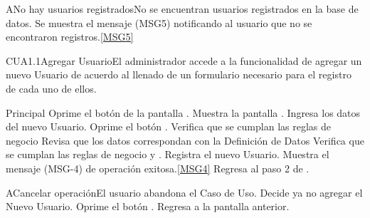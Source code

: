 	\begin{UCtrayectoriaA}{A}{No hay usuarios registrados}{No se encuentran usuarios registrados en la base de datos.}
			\UCpaso Se muestra el mensaje (MSG5) notificando al usuario que no se encontraron registros.\ref{MSG5}
	\end{UCtrayectoriaA}

	
	\begin{UseCase}{CUA1.1}{Agregar Usuario}{El administrador accede a la funcionalidad de agregar un nuevo Usuario de acuerdo al llenado de un formulario necesario para el registro de cada uno de ellos.}
	\end{UseCase}

	\begin{UCtrayectoria}{Principal}
			\UCpaso[\UCactor] Oprime el botón  de la pantalla .
			\UCpaso Muestra la pantalla .
			\UCpaso [\UCactor] Ingresa los datos del nuevo Usuario. 
			\UCpaso [\UCactor] Oprime el botón .
			\UCpaso Verifica que se cumplan las reglas de negocio  
			\UCpaso Revisa que los datos correspondan con la Definición de Datos 
			\UCpaso Verifica que se cumplan las reglas de negocio  y .  
			\UCpaso Registra el nuevo Usuario.
			\UCpaso Muestra el mensaje (MSG-4) de operación exitosa.\ref{MSG4}
			\UCpaso Regresa al paso 2 de .
	\end{UCtrayectoria}

	\begin{UCtrayectoriaA}{A}{Cancelar operación}{El usuario abandona el Caso de Uso.}
			\UCpaso[\UCactor] Decide ya no agregar el Nuevo Usuario.
			\UCpaso[\UCactor] Oprime el botón .
			\UCpaso Regresa a la pantalla anterior.
	\end{UCtrayectoriaA}

